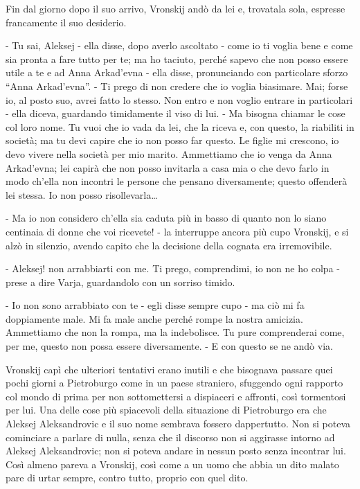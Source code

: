 Fin dal giorno dopo il suo arrivo, Vronskij andò da lei e, trovatala sola, espresse francamente il suo desiderio. 

- Tu sai, Aleksej - ella disse, dopo averlo ascoltato - come io ti voglia bene e come sia pronta a fare tutto per te; ma ho taciuto, perché sapevo che non posso essere utile a te e ad Anna Arkad'evna - ella disse, pronunciando con particolare sforzo ``Anna Arkad'evna''. - Ti prego di non credere che io voglia biasimare. Mai; forse io, al posto suo, avrei fatto lo stesso. Non entro e non voglio entrare in particolari - ella diceva, guardando timidamente il viso di lui. - Ma bisogna chiamar le cose col loro nome. Tu vuoi che io vada da lei, che la riceva e, con questo, la riabiliti in società; ma tu devi capire che io non posso far questo. Le figlie mi crescono, io devo vivere nella società per mio marito. Ammettiamo che io venga da Anna Arkad'evna; lei capirà che non posso invitarla a casa mia o che devo farlo in modo ch'ella non incontri le persone che pensano diversamente; questo offenderà lei stessa. Io non posso risollevarla\ldots{} 

- Ma io non considero ch'ella sia caduta più in basso di quanto non lo siano centinaia di donne che voi ricevete! - la interruppe ancora più cupo Vronskij, e si alzò in silenzio, avendo capito che la decisione della cognata era irremovibile. 

- Aleksej! non arrabbiarti con me. Ti prego, comprendimi, io non ne ho colpa - prese a dire Varja, guardandolo con un sorriso timido. 

- Io non sono arrabbiato con te - egli disse sempre cupo - ma ciò mi fa doppiamente male. Mi fa male anche perché rompe la nostra amicizia. Ammettiamo che non la rompa, ma la indebolisce. Tu pure comprenderai come, per me, questo non possa essere diversamente. - E con questo se ne andò via. 

Vronskij capì che ulteriori tentativi erano inutili e che bisognava passare quei pochi giorni a Pietroburgo come in un paese straniero, sfuggendo ogni rapporto col mondo di prima per non sottomettersi a dispiaceri e affronti, così tormentosi per lui. Una delle cose più spiacevoli della situazione di Pietroburgo era che Aleksej Aleksandrovic e il suo nome sembrava fossero dappertutto. Non si poteva cominciare a parlare di nulla, senza che il discorso non si aggirasse intorno ad Aleksej Aleksandrovic; non si poteva andare in nessun posto senza incontrar lui. Così almeno pareva a Vronskij, così come a un uomo che abbia un dito malato pare di urtar sempre, contro tutto, proprio con quel dito. 

